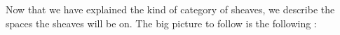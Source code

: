\documentclass[./main.tex]{subfiles}
\begin{document}
Now that we have explained
the kind of category of sheaves,
we describe the spaces the sheaves will be on.
The big picture to follow is the following : 
\end{document}
